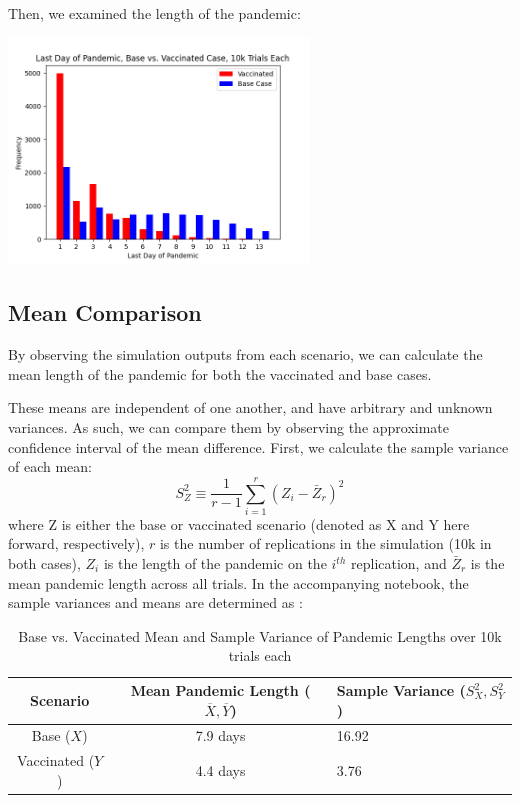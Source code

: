 \documentclass[
	letterpaper, %
]{jdf}
\begin{document}
Then, we examined the length of the pandemic:
\begin{jdffigure}
\includegraphics[height=6cm]{Figures/q5c.png}%
\end{jdffigure}

\subsection{Mean Comparison}

By observing the simulation outputs from each scenario, we can calculate the mean length of the pandemic for both the vaccinated and base cases. 

These means are independent of one another, and have arbitrary and unknown variances. As such, we can compare them by observing the  approximate confidence interval of the mean difference. First, we calculate the sample variance of each mean:
\[S_Z^2 \equiv \frac{1}{r-1} \sum_{i=1}^r\left(Z_i-\bar{Z}_r\right)^2\]
where Z is either the base or vaccinated scenario (denoted as X and Y here forward, respectively), \(r\) is the number of replications in the simulation (10k in both cases), \(Z_i\) is the length of the pandemic on the \(i^{th}\) replication, and \(\bar{Z}_r\) is the mean pandemic length across all trials. In the accompanying notebook, the sample variances and means are determined as :
\begin{table}
    \centering
    \begin{tabular}{|c|c|l|} \hline 
         Scenario& Mean Pandemic Length (\(\overline{X}, \overline{Y}\))&Sample Variance (\(S_{X}^2,S_{Y}^2\))\\ \hline 
         Base (\(X\))& 7.9 days &16.92\\ \hline 
         Vaccinated (\(Y\))& 4.4 days &3.76\\ \hline
    \end{tabular}
    \caption{Base vs. Vaccinated Mean and Sample Variance of Pandemic Lengths over 10k trials each}
    \label{tab:my_label}
\end{table}
\end{document}
